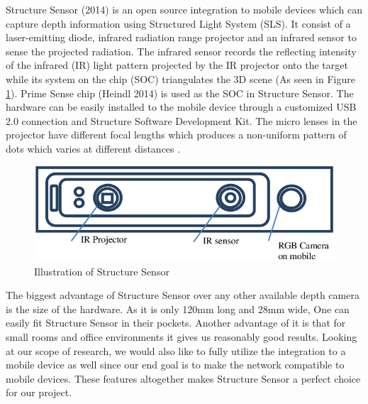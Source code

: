 Structure Sensor (2014) is an open source integration to mobile devices which can capture depth information using Structured Light System (SLS). It consist of a laser-emitting diode, infrared radiation range projector and an infrared sensor to sense the projected radiation. The infrared sensor records the reflecting intensity of the infrared (IR) light pattern projected by the IR projector onto the target while its system on the chip (SOC) triangulates the 3D scene  \cite{Kalantari} (As seen in Figure \ref{fig:Structuresensor}). Prime Sense chip (Heindl 2014) is used as the SOC in Structure Sensor. The hardware can be easily installed to the mobile device through a customized USB 2.0 connection and Structure Software Development Kit. The micro lenses in the projector have different focal lengths which produces a non-uniform pattern of dots which varies at different distances \cite{Kalantari}. \\


\begin{figure}[h]
\centering
    \includegraphics[scale=0.29]{Figures/illustration-of-structure-sensor.png}
    \caption{Illustration of Structure Sensor}
    \label{fig:Structuresensor}
\end{figure}

The biggest advantage of Structure Sensor over any other available depth camera is the size of the hardware. As it is only 120mm long and 28mm wide, One can easily fit Structure Sensor in their pockets. Another advantage of it is that for small rooms and office environments it gives us reasonably good results. Looking at our scope of research, we would also like to fully utilize the integration to a mobile device as well since our end goal is to make the network compatible to mobile devices. These features altogether makes Structure Sensor a perfect choice for our project.\\